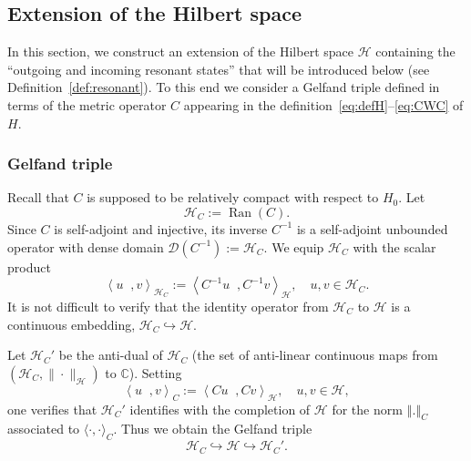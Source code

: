 \documentclass[10pt]{amsart}
\theoremstyle{definition}\newtheorem{defi}[theo]{Definition}\newtheorem{rema}[theo]{Remark}\newtheorem{exam}[theo]{Example}\newtheorem{exem}[theo]{Example}\newtheorem{nota}[theo]{Notation}
\newcommand{\Hi}{\mathcal{H}}
\newcommand{\bbC}{\mathbb{C}}
\newcommand{\norme}[1]{\left\Vert #1\right\Vert}
\newcommand{\scal}[2]{\left\langle{#1} \middle., {#2}\right\rangle}
\newcommand{\clD}{\mathcal{D}}
\DeclareMathOperator{\Ran}{Ran}
\begin{document}
\subsection{Extension of the Hilbert space}\label{subsec:extension}



In this section, we construct an extension of the Hilbert space $\Hi$ containing the ``outgoing and incoming resonant states'' that will be introduced below (see Definition~\ref{def:resonant}). To this end we consider a Gelfand triple defined in terms of the metric operator $C$ appearing in the definition~\eqref{eq:defH}--\eqref{eq:CWC} of $H$.

\subsubsection{Gelfand triple}
Recall that $C$ is supposed to be relatively compact with respect to $H_0$. Let
\begin{equation*}
\Hi_C:=\Ran(C).
\end{equation*}
Since $C$ is self-adjoint and injective, its inverse $C^{-1}$ is a self-adjoint unbounded operator with dense domain $\clD(C^{-1}):=\Hi_C$. We equip $\Hi_C$ with the scalar product
\begin{equation*}
\scal{u}{v}_{\Hi_C}:=\scal{C^{-1}u}{C^{-1}v}_\Hi,\quad u,v\in\Hi_C.
\end{equation*}
It is not difficult to verify that the identity operator from $\Hi_C$ to $\Hi$ is a continuous embedding, $\Hi_C\hookrightarrow\Hi$.

Let $\Hi_C'$ be the anti-dual of $\Hi_C$ (the set of anti-linear continuous maps from $(\Hi_C,\|\cdot\|_\Hi)$ to $\bbC$). Setting
\begin{equation*}
\scal{u}{v}_{C}:=\scal{Cu}{Cv}_\Hi, \quad u,v\in\Hi,
\end{equation*}
one verifies that $\Hi_C'$ identifies with the completion of $\Hi$ for the norm $\norme{.}_C$ associated to $\langle\cdot,\cdot\rangle_C$. Thus we obtain the Gelfand triple
\begin{equation*}
\Hi_C\hookrightarrow\Hi\hookrightarrow\Hi_C'.
\end{equation*}
\end{document}
